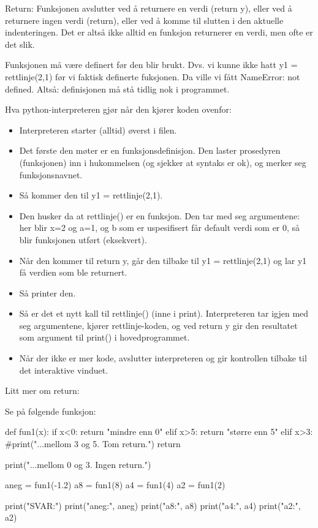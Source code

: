 {Return: 
Funksjonen avslutter ved å returnere en verdi (return y), eller ved å returnere ingen verdi (return), eller ved å komme til slutten i den aktuelle indenteringen. Det er altså ikke alltid en funksjon returnerer en verdi, men ofte er det slik. 

Funksjonen må være definert før den blir brukt. Dvs. vi kunne ikke hatt y1 = rettlinje(2,1) før vi faktisk definerte fuksjonen. Da ville vi fått NameError: not defined. Altså: definisjonen må stå tidlig nok i programmet. 

Hva python-interpreteren gjør når den kjører koden ovenfor:
\begin{itemize}
\item Interpreteren starter (alltid) øverst i filen.
\item Det første den møter er en funksjonsdefinisjon. Den laster prosedyren (funksjonen) inn i hukommelsen (og sjekker at syntaks er ok), og merker seg funksjonsnavnet. 
\item Så kommer den til y1 = rettlinje(2,1).
\item Den husker da at rettlinje() er en funksjon. Den tar med seg argumentene: her blir x=2 og a=1, og b som er uspesifisert får default verdi som er 0, så blir funksjonen utført (eksekvert). 
\item Når den kommer til return y, går den tilbake til y1 = rettlinje(2,1) og lar y1 få verdien som ble returnert.
\item Så printer den. 
\item Så er det et nytt kall til rettlinje() (inne i print). Interpreteren tar igjen med seg argumentene, kjører rettlinje-koden, og ved return y gir den resultatet som argument til print() i hovedprogrammet.
\item Når der ikke er mer kode, avslutter interpreteren og gir kontrollen tilbake til det interaktive vinduet. 
\end{itemize}

Litt mer om return:

Se på følgende funksjon: 

\begin{usncodebox}
def fun1(x):
   if x<0:
      return "mindre enn 0"
   elif x>5:
      return "større enn 5"
   elif x>3: 
      #print("...mellom 3 og 5. Tom return.")
      return

   print("...mellom 0 og 3. Ingen return.")

aneg = fun1(-1.2)
a8 = fun1(8)
a4 = fun1(4)
a2 = fun1(2)

print("SVAR:") 
print("aneg:", aneg)
print("a8:", a8)
print("a4:", a4)
print("a2:", a2)
\end{usncodebox}

}
